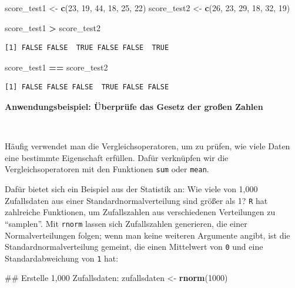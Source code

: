\documentclass[12pt,]{tufte-book}
\newenvironment{Shaded}{\begin{snugshade}}{\end{snugshade}}
\newcommand{\KeywordTok}[1]{\textcolor[rgb]{0.13,0.29,0.53}{\textbf{#1}}}
\newcommand{\DecValTok}[1]{\textcolor[rgb]{0.00,0.00,0.81}{#1}}
\newcommand{\StringTok}[1]{\textcolor[rgb]{0.31,0.60,0.02}{#1}}
\newcommand{\OperatorTok}[1]{\textcolor[rgb]{0.81,0.36,0.00}{\textbf{#1}}}
\newcommand{\NormalTok}[1]{#1}
\theoremstyle{definition}
\theoremstyle{definition}
\theoremstyle{definition}
\theoremstyle{remark}
\begin{document}
\begin{Shaded}
\begin{Highlighting}[]
\NormalTok{score_test1 <-}\StringTok{ }\KeywordTok{c}\NormalTok{(}\DecValTok{23}\NormalTok{, }\DecValTok{19}\NormalTok{, }\DecValTok{44}\NormalTok{, }\DecValTok{18}\NormalTok{, }\DecValTok{25}\NormalTok{, }\DecValTok{22}\NormalTok{)}
\NormalTok{score_test2 <-}\StringTok{ }\KeywordTok{c}\NormalTok{(}\DecValTok{26}\NormalTok{, }\DecValTok{23}\NormalTok{, }\DecValTok{29}\NormalTok{, }\DecValTok{18}\NormalTok{, }\DecValTok{32}\NormalTok{, }\DecValTok{19}\NormalTok{)}

\NormalTok{score_test1 }\OperatorTok{>}\StringTok{ }\NormalTok{score_test2}
\end{Highlighting}
\end{Shaded}

\begin{verbatim}
[1] FALSE FALSE  TRUE FALSE FALSE  TRUE
\end{verbatim}

\begin{Shaded}
\begin{Highlighting}[]
\NormalTok{score_test1 }\OperatorTok{==}\StringTok{ }\NormalTok{score_test2}
\end{Highlighting}
\end{Shaded}

\begin{verbatim}
[1] FALSE FALSE FALSE  TRUE FALSE FALSE
\end{verbatim}

\textbf{Anwendungsbeispiel: Überprüfe das Gesetz der großen Zahlen}

~

Häufig verwendet man die Vergleichsoperatoren, um zu prüfen, wie viele
Daten eine bestimmte Eigenschaft erfüllen. Dafür verknüpfen wir die
Vergleichsoperatoren mit den Funktionen \texttt{sum} oder \texttt{mean}.

Dafür bietet sich ein Beispiel aus der Statistik an: Wie viele von 1,000
Zufallsdaten aus einer Standardnormalverteilung sind größer als 1?
\texttt{R} hat zahlreiche Funktionen, um Zufallszahlen aus verschiedenen
Verteilungen zu ``samplen''. Mit \texttt{rnorm} lassen sich
Zufallszahlen generieren, die einer Normalverteilungen folgen; wenn man
keine weiteren Argumente angibt, ist die Standardnormalverteilung
gemeint, die einen Mittelwert von \texttt{0} und eine Standardabweichung
von \texttt{1} hat:

\begin{Shaded}
\begin{Highlighting}[]
\NormalTok{## Erstelle 1,000 Zufallsdaten:}
\NormalTok{zufallsdaten <-}\StringTok{ }\KeywordTok{rnorm}\NormalTok{(}\DecValTok{1000}\NormalTok{)}
\end{Highlighting}
\end{Shaded}
\end{document}
